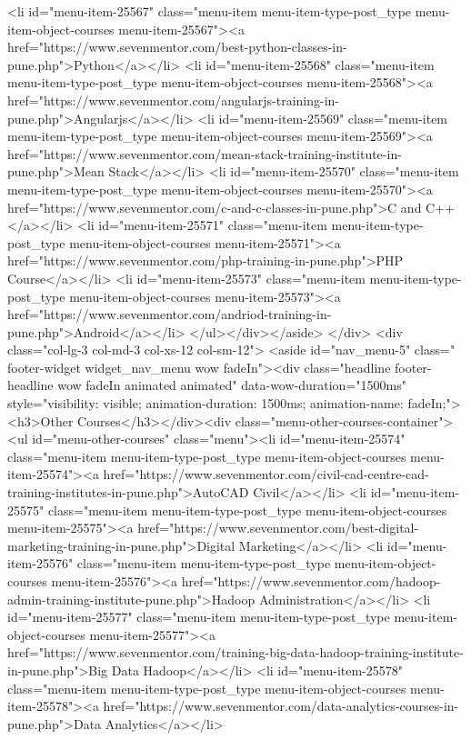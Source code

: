 {<li id="menu-item-25567" class="menu-item menu-item-type-post_type menu-item-object-courses menu-item-25567"><a href="https://www.sevenmentor.com/best-python-classes-in-pune.php">Python</a></li>
<li id="menu-item-25568" class="menu-item menu-item-type-post_type menu-item-object-courses menu-item-25568"><a href="https://www.sevenmentor.com/angularjs-training-in-pune.php">Angularjs</a></li>
<li id="menu-item-25569" class="menu-item menu-item-type-post_type menu-item-object-courses menu-item-25569"><a href="https://www.sevenmentor.com/mean-stack-training-institute-in-pune.php">Mean Stack</a></li>
<li id="menu-item-25570" class="menu-item menu-item-type-post_type menu-item-object-courses menu-item-25570"><a href="https://www.sevenmentor.com/c-and-c-classes-in-pune.php">C and C++</a></li>
<li id="menu-item-25571" class="menu-item menu-item-type-post_type menu-item-object-courses menu-item-25571"><a href="https://www.sevenmentor.com/php-training-in-pune.php">PHP Course</a></li>
<li id="menu-item-25573" class="menu-item menu-item-type-post_type menu-item-object-courses menu-item-25573"><a href="https://www.sevenmentor.com/andriod-training-in-pune.php">Android</a></li>
</ul></div></aside> </div>
<div class="col-lg-3 col-md-3 col-xs-12 col-sm-12">
<aside id="nav_menu-5" class=" footer-widget widget_nav_menu wow  fadeIn"><div class="headline footer-headline wow fadeIn animated animated" data-wow-duration="1500ms" style="visibility: visible; animation-duration: 1500ms; animation-name: fadeIn;"><h3>Other Courses</h3></div><div class="menu-other-courses-container"><ul id="menu-other-courses" class="menu"><li id="menu-item-25574" class="menu-item menu-item-type-post_type menu-item-object-courses menu-item-25574"><a href="https://www.sevenmentor.com/civil-cad-centre-cad-training-institutes-in-pune.php">AutoCAD Civil</a></li>
<li id="menu-item-25575" class="menu-item menu-item-type-post_type menu-item-object-courses menu-item-25575"><a href="https://www.sevenmentor.com/best-digital-marketing-training-in-pune.php">Digital Marketing</a></li>
<li id="menu-item-25576" class="menu-item menu-item-type-post_type menu-item-object-courses menu-item-25576"><a href="https://www.sevenmentor.com/hadoop-admin-training-institute-pune.php">Hadoop Administration</a></li>
<li id="menu-item-25577" class="menu-item menu-item-type-post_type menu-item-object-courses menu-item-25577"><a href="https://www.sevenmentor.com/training-big-data-hadoop-training-institute-in-pune.php">Big Data Hadoop</a></li>
<li id="menu-item-25578" class="menu-item menu-item-type-post_type menu-item-object-courses menu-item-25578"><a href="https://www.sevenmentor.com/data-analytics-courses-in-pune.php">Data Analytics</a></li>
}
